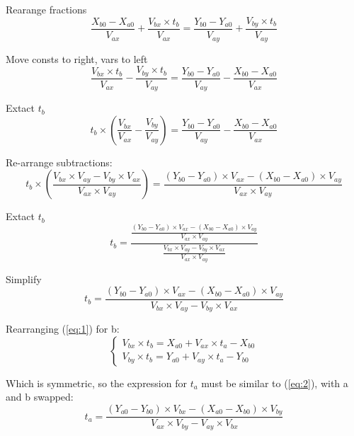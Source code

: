 \documentclass{article}
\begin{document}
Rearange fractions
\begin{displaymath}
    \frac{X_{b0} - X_{a0}}{V_{ax}} + \frac{V_{bx} \times t_b}{V_{ax}} = \frac{Y_{b0} - Y_{a0}}{V_{ay}} + \frac{V_{by} \times t_b}{V_{ay}}
\end{displaymath}
    

Move consts to right, vars to left
\begin{displaymath}
    \frac{V_{bx} \times t_b}{V_{ax}} - \frac{V_{by} \times t_b}{V_{ay}} = \frac{Y_{b0} - Y_{a0}}{V_{ay}} - \frac{X_{b0} - X_{a0}}{V_{ax}}
\end{displaymath}
    

Extact $t_b$
\begin{displaymath}
    t_b \times (\frac{V_{bx}}{V_{ax}} - \frac{V_{by}}{V_{ay}}) = \frac{Y_{b0} - Y_{a0}}{V_{ay}} - \frac{X_{b0} - X_{a0}}{V_{ax}}
\end{displaymath}


Re-arrange subtractions:
\begin{displaymath}
    t_b \times (\frac{V_{bx} \times V_{ay} - V_{by} \times V_{ax}}{V_{ax} \times V_{ay}}) = \frac{(Y_{b0} - Y_{a0}) \times V_{ax} - (X_{b0} - X_{a0}) \times V_{ay}}{V_{ax} \times V_{ay}}
\end{displaymath}

Extact $t_b$
\begin{displaymath}
    t_b = \frac{\frac{(Y_{b0} - Y_{a0}) \times V_{ax} - (X_{b0} - X_{a0}) \times V_{ay}}{V_{ax} \times V_{ay}}}{\frac{V_{bx} \times V_{ay} - V_{by} \times V_{ax}}{V_{ax} \times V_{ay}}}
\end{displaymath}

Simplify
\begin{equation} \label{eq:2}
    t_b = \frac{(Y_{b0} - Y_{a0}) \times V_{ax} - (X_{b0} - X_{a0}) \times V_{ay}}{V_{bx} \times V_{ay} - V_{by} \times V_{ax}}
\end{equation}

Rearranging (\ref{eq:1}) for b:
\begin{displaymath}
    \begin{cases}
    V_{bx} \times t_b = X_{a0} + V_{ax} \times t_a - X_{b0} \\
    V_{by} \times t_b = Y_{a0} + V_{ay} \times t_a - Y_{b0}
    \end{cases}
\end{displaymath}

Which is symmetric, so the expression for $t_a$ must be similar to (\ref{eq:2}), with a and b swapped:
\begin{displaymath}
    t_a = \frac{(Y_{a0} - Y_{b0}) \times V_{bx} - (X_{a0} - X_{b0}) \times V_{by}}{V_{ax} \times V_{by} - V_{ay} \times V_{bx}}
\end{displaymath}
\end{document}
